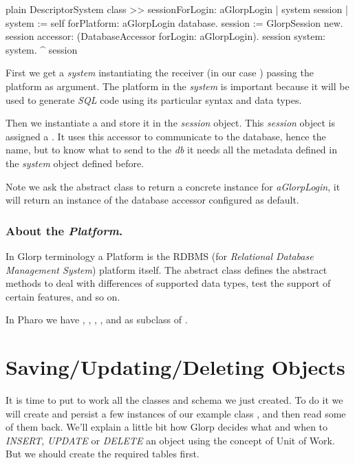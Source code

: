 \documentclass[10pt,twoside,english]{_support/latex/sbabook/sbabook}
\begin{document}
\begin{displaycode}{plain}
DescriptorSystem class >> sessionForLogin: aGlorpLogin
	| system session |
	system := self forPlatform: aGlorpLogin database.
	session := GlorpSession new.
	session accessor: (DatabaseAccessor forLogin: aGlorpLogin).
	session system: system.
	^ session
\end{displaycode}

First we get a \textit{system} instantiating the receiver (in our case
 ) passing the platform as argument.
The platform in the \textit{system} is important because it will be used to
generate \textit{SQL} code using its particular syntax and data types.

Then we instantiate a  and store it in the \textit{session} object.
This \textit{session} object is assigned a . It uses this
accessor to communicate to the database, hence the name, but to know what to
send to the \textit{db} it needs all the metadata defined in the \textit{system} object
defined before.

Note we ask the abstract  class to return a concrete
instance for \textit{aGlorpLogin}, it will return an instance of the
database accessor configured as default.
\subsubsection{About the \textit{Platform}.}
In Glorp terminology a Platform is the RDBMS (for \textit{Relational Database
Management System}) platform itself. The abstract class  defines the
abstract methods to deal with differences of supported data types,
test the support of certain features, and so on.

In Pharo we have 
, , , ,  and 
as subclass of .
\section{Saving/Updating/Deleting Objects}
It is time to put to work all the classes and schema we just created. To do it
we will create and persist a few instances of our example class , and
then read some of them back. We'll explain a little bit
how Glorp decides what and when to \textit{INSERT}, \textit{UPDATE} or \textit{DELETE} an object using
the concept of Unit of Work. But we should create the required tables first.
\end{document}

